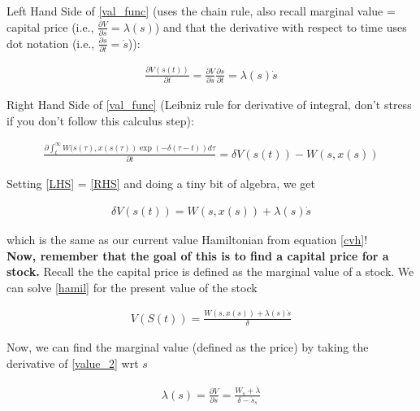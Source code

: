 \documentclass{article}
\begin{document}
Left Hand Side of \ref{val_func} (uses the chain rule, also recall marginal value = capital price (i.e., $\frac{\partial V}{\partial s} = \lambda(s)$) and that the derivative with respect to time uses dot notation (i.e., $\frac{\partial s}{\partial t} = \dot s$)): 

\begin{align}
    \frac{\partial V(s(t))}{\partial t} = \frac{\partial V}{\partial s} \frac{\partial s}{\partial t} = \lambda(s) \dot s
    \label{LHS}
\end{align}


Right Hand Side of \ref{val_func} (Leibniz rule for derivative of integral, don't stress if you don't follow this calculus step):

\begin{align}
    \frac{\partial \int_t^\infty W(s(\tau), x(s(\tau)) \exp(-\delta(\tau-t))d\tau}{\partial t}= \delta V(s(t)) - W(s, x(s)) 
    \label{RHS}
\end{align}


Setting \ref{LHS} = \ref{RHS} and doing a tiny bit of algebra, we get 


\begin{align}
    \delta V(s(t)) = W(s, x(s)) + \lambda(s) \dot s 
    \label{hamil}
\end{align}

which is the same as our current value Hamiltonian from equation \ref{cvh}! \\

\textbf{Now, remember that the goal of this is to find a capital price for a stock.} Recall the the capital price is defined as the marginal value of a stock. We can solve \ref{hamil} for the present value of the stock

\begin{align}
    V(S(t)) = \frac{W(s, x(s)) + \lambda(s) \dot s}{\delta}
    \label{value_2}
\end{align}

Now, we can find the marginal value (defined as the price) by taking the derivative of \ref{value_2} wrt $s$

\begin{align}
    \lambda(s) = \frac{\partial V}{\partial s} = \frac{W_s + \dot \lambda}{\delta - \dot s_s}
    \label{cap_price}
\end{align}
\end{document}
